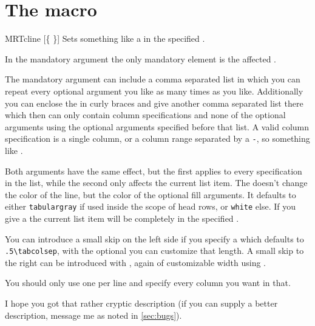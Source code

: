 \section{The  macro}\label{sec:tab:cline}%
\begin{describemacro}{MRTcline}%
  [\{\meta{*}%
  \}]
  Sets something like a  in the specified .

  In the mandatory argument the only mandatory element is the affected
  .
  
  The mandatory argument can include a comma separated list in which you can
  repeat every optional argument you like as many times as you like.
  Additionally you can enclose the  in curly braces and give another
  comma separated list there which then can only contain column specifications
  and none of the optional arguments using the optional arguments specified
  before that list. A valid column specification is a single column, or a column
  range separated by a \texttt{-}, so something like .

  Both  arguments have the same effect, but the first applies to
  every specification in the list, while the second only affects the current
  list item. The  doesn't change the color of the line, but the
  color of the optional fill arguments. It defaults to either
  \texttt{tabulargray} if used inside the scope of head rows, or \texttt{white}
  else. If you give a \meta{*} the current list item will be completely in the
  specified .

  You can introduce a small skip on the left side if you specify a \meta{<}
  which defaults to \verb|.5\tabcolsep|, with the optional  you
  can customize that length. A small skip to the right can be introduced with
  \meta{>}, again of customizable width using .

  You should only use one  per line and specify every column you
  want in that.
\end{describemacro}%

I hope you got that rather cryptic description (if you can supply a better
description, message me as noted in \autoref{sec:bugs}).

